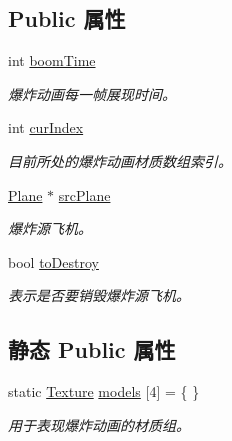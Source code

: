 \subsection*{Public 属性}
\begin{DoxyCompactItemize}
\item 
\mbox{\label{class_action___plane___explode_a3425e9988fc97a794c01b3288df4afe6}} 
int \hyperlink{class_action___plane___explode_a3425e9988fc97a794c01b3288df4afe6}{boom\+Time}
\begin{DoxyCompactList}\small\item\em 爆炸动画每一帧展现时间。 \end{DoxyCompactList}\item 
\mbox{\label{class_action___plane___explode_a5da7d39e28db0b1a852ae81cc6e96ba5}} 
int \hyperlink{class_action___plane___explode_a5da7d39e28db0b1a852ae81cc6e96ba5}{cur\+Index}
\begin{DoxyCompactList}\small\item\em 目前所处的爆炸动画材质数组索引。 \end{DoxyCompactList}\item 
\mbox{\label{class_action___plane___explode_a98d4991b3266a6c7fc5ebbad4d41f136}} 
\hyperlink{class_plane}{Plane} $\ast$ \hyperlink{class_action___plane___explode_a98d4991b3266a6c7fc5ebbad4d41f136}{src\+Plane}
\begin{DoxyCompactList}\small\item\em 爆炸源飞机。 \end{DoxyCompactList}\item 
\mbox{\label{class_action___plane___explode_a655f5cf52656c4ce16040d2310494029}} 
bool \hyperlink{class_action___plane___explode_a655f5cf52656c4ce16040d2310494029}{to\+Destroy}
\begin{DoxyCompactList}\small\item\em 表示是否要销毁爆炸源飞机。 \end{DoxyCompactList}\end{DoxyCompactItemize}
\subsection*{静态 Public 属性}
\begin{DoxyCompactItemize}
\item 
\mbox{\label{class_action___plane___explode_ab37c2419e1e16a739b856de09df79909}} 
static \hyperlink{struct_texture}{Texture} \hyperlink{class_action___plane___explode_ab37c2419e1e16a739b856de09df79909}{models} \mbox{[}4\mbox{]} = \{ \}
\begin{DoxyCompactList}\small\item\em 用于表现爆炸动画的材质组。 \end{DoxyCompactList}\end{DoxyCompactItemize}


